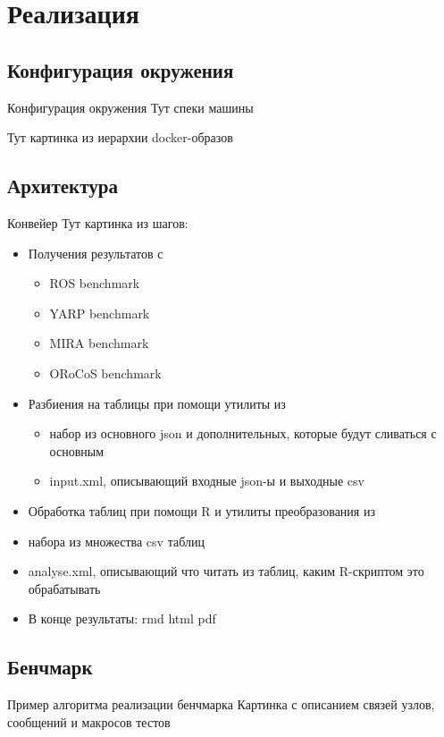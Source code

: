 \section{Реализация}


\subsection{Конфигурация окружения}
\begin{frame}{Конфигурация окружения}
	Тут спеки машины
	
	Тут картинка из иерархии docker-образов
\end{frame}

\subsection{Архитектура}
\begin{frame}{Конвейер}
	Тут картинка из шагов:
	\begin{itemize}
		\item Получения результатов с
		\begin{itemize}
			\item ROS benchmark 
			\item YARP benchmark
			\item MIRA benchmark
			\item ORoCoS benchmark
		\end{itemize}
		\item Разбиения на таблицы при помощи утилиты из 
		\begin{itemize}
			\item набор из основного json и дополнительных, которые будут сливаться с основным
			\item input.xml, описывающий входные json-ы и выходные csv
		\end{itemize}
		\item Обработка таблиц при помощи R и утилиты преобразования из
			\item набора из множества csv таблиц
			\item analyse.xml, описывающий что читать из таблиц, каким R-скриптом это обрабатывать
		\item В конце результаты: rmd html pdf
	\end{itemize}
\end{frame}

\subsection{Бенчмарк}
\begin{frame}{Пример алгоритма реализации бенчмарка}
	Картинка с описанием связей узлов, сообщений и макросов тестов
\end{frame}

